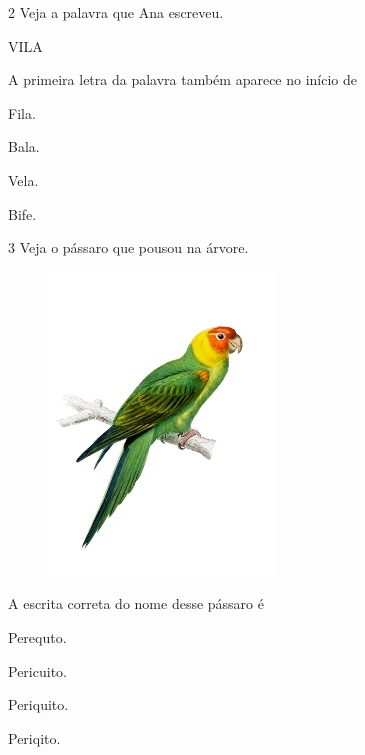 \num{2} Veja a palavra que Ana escreveu.

\begin{myquote}
VILA
\end{myquote}

A primeira letra da palavra também aparece no início de 

\begin{escolha}
\item Fila.

\item Bala.

\item Vela.

\item Bife.
\end{escolha}

\num{3} Veja o pássaro que pousou na árvore.

\begin{figure}[htpb!]
\centering
\includegraphics[width=.5\textwidth]{media/image165.jpeg}
\end{figure}


A escrita correta do nome desse pássaro é

\begin{escolha}
\item Perequto.

\item Pericuito.

\item Periquito.

\item Periqito.
\end{escolha}

